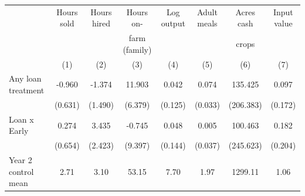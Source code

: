 \begin{tabular}{l cc cc cc c}
\hline
 & Hours sold & Hours hired & Hours on- & Log output & Adult meals & Acres cash & Input value \\ 
 & & & farm (family) & & & crops &  \\ 
 & (1) & (2) & (3) & (4) & (5) & (6) & (7)  \\ 
\hline
Any loan treatment & -0.960 & -1.374 & 11.903 & 0.042 & 0.074 & 135.425 & 0.097 \\
 & (0.631) & (1.490) & (6.379) & (0.125) & (0.033) & (206.383) & (0.172) \\
Loan x Early & 0.274  & 3.435  & -0.745  & 0.048  & 0.005 & 100.463 & 0.182 \\
  & (0.654) & (2.423) & (9.397) & (0.144) & (0.037) & (245.623) & (0.204) \\
\hline
Year 2 control mean & 2.71 & 3.10 & 53.15 & 7.70 & 1.97 & 1299.11 & 1.06 \\
 \hline 
\end{tabular} \\
